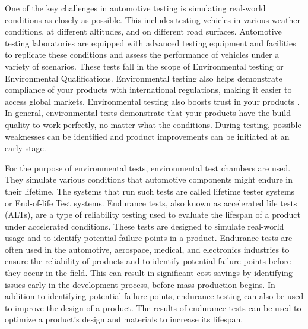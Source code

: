 One of the key challenges in automotive testing is simulating real-world conditions as closely as possible. This includes testing vehicles in various weather conditions, at different altitudes, and on different road surfaces. Automotive testing laboratories are equipped with advanced testing equipment and facilities to replicate these conditions and assess the performance of vehicles under a variety of scenarios. These tests fall in the scope of Environmental testing or Environmental Qualifications. Environmental testing also helps demonstrate compliance of your products with international regulations, making it easier to access global markets. Environmental testing also boosts trust in your products \cite{tüv}. In general, environmental tests demonstrate that your products have the build quality to work perfectly, no matter what the conditions. During testing, possible weaknesses can be identified and product improvements can be initiated at an early stage. 

For the purpose of environmental tests, environmental test chambers are used. They simulate various conditions that automotive components might endure in their lifetime. The systems that run such tests are called lifetime tester systems or End-of-life Test systems. Endurance tests, also known as accelerated life tests (ALTs), are a type of reliability testing used to evaluate the lifespan of a product under accelerated conditions. These tests are designed to simulate real-world usage and to identify potential failure points in a product. Endurance tests are often used in the automotive, aerospace, medical, and electronics industries to ensure the reliability of products and to identify potential failure points before they occur in the field. This can result in significant cost savings by identifying issues early in the development process, before mass production begins. In addition to identifying potential failure points, endurance testing can also be used to improve the design of a product. The results of endurance tests can be used to optimize a product's design and materials to increase its lifespan.

